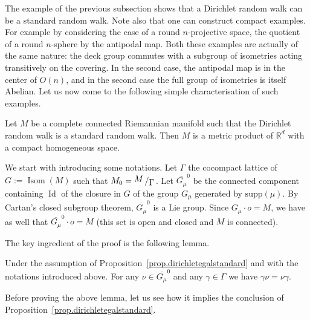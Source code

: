 \documentclass[AHL,Unicode,longabstracts,published]{cedram}
\DeclareMathOperator{\Isom}{Isom}
\DeclareMathOperator{\Id}{Id}
\newcommand{\RR}{\mathbb{R}}
\newcommand{\supp}[1]{\mathrm{supp}(#1)}
\newcommand{\quotient}[2]{{\raisebox{.2em}{$#1$}\left/\raisebox{-.2em}{$#2$}\right.}}
\begin{document}
The example of the previous subsection shows that a Dirichlet random walk can be a standard random walk. Note also that one can construct compact examples. For example by considering the case of a round $n$-projective space, the quotient of a round $n$-sphere by the antipodal map. Both these examples are actually of the same nature: the deck group commutes with a subgroup of isometries acting transitively on the covering. In the second case, the antipodal map is in the center of $O(n)$, and in the second case the full group of isometries is itself Abelian. Let us now come to the following simple characterisation of such examples.

\begin{prop}\label{prop.dirichletegalstandard}
Let $M$ be a complete connected Riemannian manifold such that the Dirichlet random walk is a standard random walk. Then $M$ is a metric product of $\RR^d$ with a compact homogeneous space.
\end{prop}


We start with introducing some notations. Let $\Gamma$ the cocompact lattice of $G := \Isom(M)$ such that $M_0 = \quotient{M}{\Gamma}$. Let $\overline{G_{\mu}}^0$ be the connected component containing $\Id$ of the closure in $G$ of the group $G_{\mu}$ generated by $\supp{\mu}$. By Cartan's closed subgroup theorem, $\overline{G_{\mu}}^0$ is a Lie group. Since $G_{\mu} \cdot o = M$, we have as well that $\overline{G_{\mu}}^0 \cdot o = M$ (this set is open and closed and $M$ is connected).

The key ingredient of the proof is the following lemma.

\begin{lemm}\label{lemma.dirichletegalstandard}
Under the assumption of Proposition~\ref{prop.dirichletegalstandard} and with the notations introduced above. For any $\nu \in \overline{G_{\mu}}^0$ and any $ \gamma \in \Gamma$ we have $\gamma \nu = \nu \gamma$.
\end{lemm}

Before proving the above lemma, let us see how it implies the conclusion of Proposition~\ref{prop.dirichletegalstandard}. 
\end{document}

